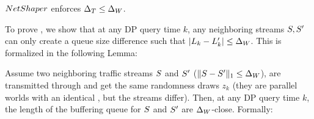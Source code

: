 {\small
\begin{numprop}[\ref{prop:sensitivity}]
  {${NetShaper}$} enforces $\Delta_T \leq \Delta_{W}$.
\end{numprop}
\noindent To prove , we show that at any DP query time
$k$, any neighboring streams $S, S'$ can only create a queue size
difference such that $|L_{k} - L_{k}'| \leq \Delta_{W}$. This is formalized
in the following Lemma:
\begin{lemma}\label{lemma:sensitivity-time}
Assume two neighboring traffic streams $S$ and $S'$
($\|S-S'\|_1 \leq \Delta_{W}$), are transmitted through {\sys} and
get the same randomness draws $z_k$ (they are parallel worlds with an identical
  \sys, but the streams differ).
Then, at any DP query time $k$, the length of the buffering queue for
  $S$ and $S'$ are $\Delta_{W}$-close.
Formally:


\end{lemma}}
